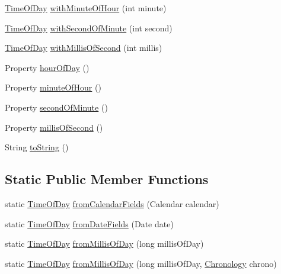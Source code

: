 \begin{DoxyCompactItemize}
\hyperlink{classorg_1_1joda_1_1time_1_1_time_of_day}{Time\-Of\-Day} \hyperlink{classorg_1_1joda_1_1time_1_1_time_of_day_a03385f1d415173f9d0153746c3bd13d1}{with\-Minute\-Of\-Hour} (int minute)
\item 
\hyperlink{classorg_1_1joda_1_1time_1_1_time_of_day}{Time\-Of\-Day} \hyperlink{classorg_1_1joda_1_1time_1_1_time_of_day_ad28c4a7b73c6f9c1fb04595e998d193b}{with\-Second\-Of\-Minute} (int second)
\item 
\hyperlink{classorg_1_1joda_1_1time_1_1_time_of_day}{Time\-Of\-Day} \hyperlink{classorg_1_1joda_1_1time_1_1_time_of_day_a7fe2359fb0187922b14907de5dd1b1b8}{with\-Millis\-Of\-Second} (int millis)
\item 
Property \hyperlink{classorg_1_1joda_1_1time_1_1_time_of_day_a8dd140a8112cba92d90d8bcb00a1764b}{hour\-Of\-Day} ()
\item 
Property \hyperlink{classorg_1_1joda_1_1time_1_1_time_of_day_ac30a9f76ce74ec5b0337a7e860b9668f}{minute\-Of\-Hour} ()
\item 
Property \hyperlink{classorg_1_1joda_1_1time_1_1_time_of_day_af0c5da02c644c96420b4faa14b9a58b2}{second\-Of\-Minute} ()
\item 
Property \hyperlink{classorg_1_1joda_1_1time_1_1_time_of_day_a9123463c9034f7bc85f4234cf97176f6}{millis\-Of\-Second} ()
\item 
String \hyperlink{classorg_1_1joda_1_1time_1_1_time_of_day_aa8b03d6b4a45fa8b3db458622b6ff35d}{to\-String} ()
\end{DoxyCompactItemize}
\subsection*{Static Public Member Functions}
\begin{DoxyCompactItemize}
\item 
static \hyperlink{classorg_1_1joda_1_1time_1_1_time_of_day}{Time\-Of\-Day} \hyperlink{classorg_1_1joda_1_1time_1_1_time_of_day_a3a5a8cc6775c693685defde0fdc25ec1}{from\-Calendar\-Fields} (Calendar calendar)
\item 
static \hyperlink{classorg_1_1joda_1_1time_1_1_time_of_day}{Time\-Of\-Day} \hyperlink{classorg_1_1joda_1_1time_1_1_time_of_day_ae499a02606632d2f567e761d98091127}{from\-Date\-Fields} (Date date)
\item 
static \hyperlink{classorg_1_1joda_1_1time_1_1_time_of_day}{Time\-Of\-Day} \hyperlink{classorg_1_1joda_1_1time_1_1_time_of_day_afdf3a3d55082d3df5963e16da9f33e6e}{from\-Millis\-Of\-Day} (long millis\-Of\-Day)
\item 
static \hyperlink{classorg_1_1joda_1_1time_1_1_time_of_day}{Time\-Of\-Day} \hyperlink{classorg_1_1joda_1_1time_1_1_time_of_day_a808969e8395ab15e68eb5015e632b884}{from\-Millis\-Of\-Day} (long millis\-Of\-Day, \hyperlink{classorg_1_1joda_1_1time_1_1_chronology}{Chronology} chrono)
\end{DoxyCompactItemize}
